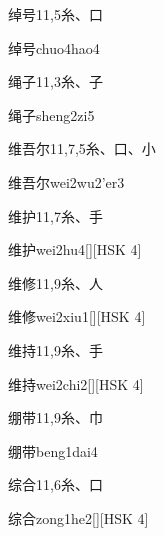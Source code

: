 \begin{entry}{绰号}{11,5}{⽷、⼝}
  \begin{phonetics}{绰号}{chuo4hao4}
  \end{phonetics}
\end{entry}

\begin{entry}{绳子}{11,3}{⽷、⼦}
  \begin{phonetics}{绳子}{sheng2zi5}
  \end{phonetics}
\end{entry}

\begin{entry}{维吾尔}{11,7,5}{⽷、⼝、⼩}
  \begin{phonetics}{维吾尔}{wei2wu2'er3}
  \end{phonetics}
\end{entry}

\begin{entry}{维护}{11,7}{⽷、⼿}
  \begin{phonetics}{维护}{wei2hu4}[][HSK 4]
  \end{phonetics}
\end{entry}

\begin{entry}{维修}{11,9}{⽷、⼈}
  \begin{phonetics}{维修}{wei2xiu1}[][HSK 4]
  \end{phonetics}
\end{entry}

\begin{entry}{维持}{11,9}{⽷、⼿}
  \begin{phonetics}{维持}{wei2chi2}[][HSK 4]
  \end{phonetics}
\end{entry}

\begin{entry}{绷带}{11,9}{⽷、⼱}
  \begin{phonetics}{绷带}{beng1dai4}
  \end{phonetics}
\end{entry}

\begin{entry}{综合}{11,6}{⽷、⼝}
  \begin{phonetics}{综合}{zong1he2}[][HSK 4]
  \end{phonetics}
\end{entry}

